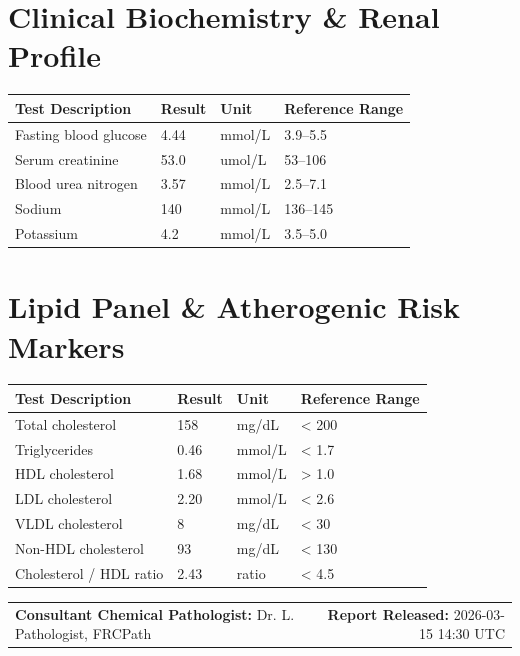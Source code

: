 \documentclass[10pt,a4paper]{article}
\begin{document}
\vspace{8pt}

\section*{Clinical Biochemistry \& Renal Profile}

\begin{tabular}{@{} p{6.4cm} p{2.5cm} p{2.5cm} p{3.1cm} @{}}
  \toprule
  \textbf{Test Description} & \textbf{Result} & \textbf{Unit} & \textbf{Reference Range} \\
  \midrule
  Fasting blood glucose & 4.44 & mmol/L & 3.9--5.5 \\
  Serum creatinine & 53.0 & umol/L & 53--106 \\
  Blood urea nitrogen & 3.57 & mmol/L & 2.5--7.1 \\
  Sodium & 140 & mmol/L & 136--145 \\
  Potassium & 4.2 & mmol/L & 3.5--5.0 \\
  \bottomrule
\end{tabular}

\vspace{8pt}

\section*{Lipid Panel \& Atherogenic Risk Markers}

\begin{tabular}{@{} p{6.4cm} p{2.5cm} p{2.5cm} p{3.1cm} @{}}
  \toprule
  \textbf{Test Description} & \textbf{Result} & \textbf{Unit} & \textbf{Reference Range} \\
  \midrule
  Total cholesterol & 158 & mg/dL & < 200 \\
  Triglycerides & 0.46 & mmol/L & < 1.7 \\
  HDL cholesterol & 1.68 & mmol/L & > 1.0 \\
  LDL cholesterol & 2.20 & mmol/L & < 2.6 \\
  VLDL cholesterol & 8 & mg/dL & < 30 \\
  Non-HDL cholesterol & 93 & mg/dL & < 130 \\
  Cholesterol / HDL ratio & 2.43 & ratio & < 4.5 \\
  \bottomrule
\end{tabular}

\vspace{14pt}

\noindent
\begin{tabular*}{\textwidth}{@{} l @{\extracolsep{\fill}} r @{}}
  \textbf{Consultant Chemical Pathologist:} Dr. L. Pathologist, FRCPath & \textbf{Report Released:} 2026-03-15 14:30 UTC \\
\end{tabular*}
\end{document}
